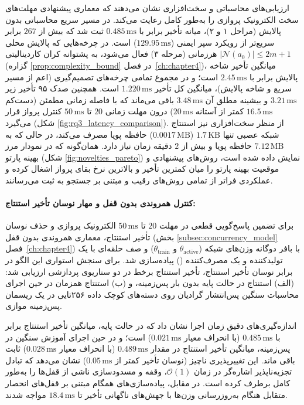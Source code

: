 \documentclass[oneside,openany,phd]{TMU-Thesis}
\begin{document}
ارزیابی‌های محاسباتی و سخت‌افزاری نشان می‌دهند که معماری پیشنهادی مهلت‌های سخت الکترونیک پروازی را به‌طور کامل رعایت می‌کند. در مسیر سریع محاسباتی بدون پالایش (مراحل ۱ و ۲)، میانه تأخیر برابر با $0.485\,\text{ms}$ ثبت شد که بیش از $267$ برابر سریع‌تر از رویکرد سپر ایمنی ($129.95\,\text{ms}$) است. در چرخه‌هایی که پالایش محلی هرزمانی (مرحله ۳) فعال می‌شود، به پشتوانه کران کاردینالیتی $|\mathcal{N}(a_0)| \le 2m + 1$ (گزاره \ref{prop:complexity_bound} در فصل~\ref{ch:chapter4})، میانگین تأخیر شاخه پالایش برابر با $2.45\,\text{ms}$ است؛ و در مجموع تمامی چرخه‌های تصمیم‌گیری (اعم از مسیر سریع و شاخه پالایش)، میانگین کل تأخیر $1.220\,\text{ms}$ است. همچنین صدک ۹۵ تأخیر زیر $3.21\,\text{ms}$ و بیشینه مطلق آن $3.48\,\text{ms}$ باقی می‌ماند که با فاصله زمانی مطمئن (دست‌کم $16.5\,\text{ms}$ کمتر از آستانه $20\,\text{ms}$) درون مهلت زمانی $20$ تا $50\,\text{ms}$ کنترل پرواز قرار می‌گیرد (شکل \ref{fig:rq3_latency_comparison}). از منظر سخت‌افزاری نیز استنتاج شبکه عصبی تنها $1.7\,\text{KB}$ ($0.0017\,\text{MB}$) حافظه پویا مصرف می‌کند، در حالی که  به $7.12\,\text{MB}$ حافظه پویا و بیش از $2$ دقیقه زمان نیاز دارد. همان‌گونه که در نمودار مرز بهینه پارتو (شکل \ref{fig:novelties_pareto}) نمایش داده شده است، روش‌های پیشنهادی \rsdrlplus و \mursdrl موقعیت بهینه پارتو را میان کمترین تأخیر و بالاترین نرخ بقای پرواز اشغال کرده و عملکردی فراتر از تمامی روش‌های رقیب و مبتنی بر جستجو به ثبت می‌رسانند.

\paragraph{کنترل همروندی بدون قفل و مهار نوسان تأخیر استنتاج:}
برای تضمین پاسخ‌گویی قطعی در مهلت $20$ تا $50\,\text{ms}$ الکترونیک پروازی و حذف نوسان تأخیر استنتاج، معماری همروندی بدون قفل (بخش \ref{subsec:concurrency_model} فصل~\ref{ch:chapter4}) با بافر دوگانه وزن‌های شبکه ($\theta_{\text{active}}$ و $\theta_{\text{train}}$) و صف حلقه‌ای با یک تولیدکننده و یک مصرف‌کننده () پیاده‌سازی شد. برای سنجش استواری این الگو در برابر نوسان تأخیر استنتاج، تأخیر استنتاج برخط در دو سناریوی پردازشی ارزیابی شد: (الف) استنتاج در حالت پایه بدون بار پس‌زمینه، و (ب) استنتاج همزمان در حین اجرای محاسبات سنگین پس‌انتشار گرادیان روی دسته‌های کوچک داده ۲۵۶تایی در یک ریسمان پس‌زمینه موازی. 

اندازه‌گیری‌های دقیق زمان اجرا نشان داد که در حالت پایه، میانگین تأخیر استنتاج برابر با $0.485\,\text{ms}$ (با انحراف معیار $0.021\,\text{ms}$) است؛ و در حین اجرای آموزش سنگین در پس‌زمینه، میانگین تأخیر استنتاج در مقدار $0.489\,\text{ms}$ (با انحراف معیار $0.028\,\text{ms}$) ثابت باقی ماند. این تغییرپذیری ناچیز (نوسان تأخیر کمتر از $0.05\,\text{ms}$) نشان می‌دهد که تبادل تجزیه‌ناپذیر اشاره‌گر در زمان $\mathcal{O}(1)$، وقفه و مسدودسازی ناشی از قفل‌ها را به‌طور کامل برطرف کرده است. در مقابل، پیاده‌سازی‌های همگام مبتنی بر قفل‌های انحصار متقابل هنگام به‌روزرسانی وزن‌ها با جهش‌های ناگهانی تأخیر تا $18.4\,\text{ms}$ مواجه شدند.
\end{document}

